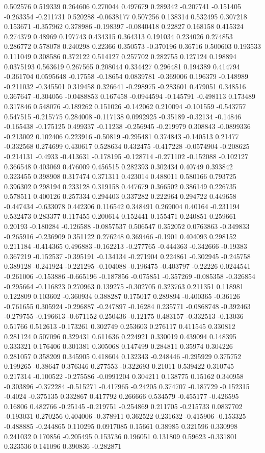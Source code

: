 0.502576 0.519339 0.264606 0.270044 0.497679 0.289342 -0.207741 -0.151405 -0.263354 -0.211731 0.520288 -0.0638177 0.507256 0.138314 0.532495 0.307218 0.153671 -0.357962 0.378986 -0.198397 -0.0840418 0.22827 0.168158 0.415324 0.274379 0.48969 0.197743 0.434315 0.364313 0.191034 0.234026 0.274853 0.286772 0.578078 0.240298 0.22366 0.350573 -0.370196 0.36716 0.500603 0.193533 0.111049 0.308586 0.372122 0.514127 0.257702 0.282755 0.127124 0.198894 0.0375193 0.563619 0.267565 0.208044 0.334427 0.296481 0.194389 0.414794 -0.361704 0.0595648 -0.17558 -0.18654 0.0839781 -0.369006 0.196379 -0.148989 -0.211032 -0.345501 0.319458 0.326641 -0.298975 -0.283601 0.479051 0.348516 0.367647 -0.304056 -0.0488853 0.167458 -0.0944594 -0.145791 -0.498113 0.173489 0.317846 0.548076 -0.189262 0.151026 -0.142062 0.210094 -0.101559 -0.543757 0.547515 -0.215775 0.284008 -0.117138 0.0992925 -0.35189 -0.32134 -0.14846 -0.165438 -0.175125 0.499337 -0.11238 -0.256945 -0.219979 0.308843 -0.0899336 -0.213002 0.102406 0.223916 -0.50819 -0.295481 0.374843 -0.140513 0.21477 -0.332568 0.274699 0.430617 0.528634 0.432475 -0.417228 -0.0574904 -0.208625 -0.214131 -0.4933 -0.413631 -0.178195 -0.128714 -0.271102 -0.152088 -0.102127 0.366548 0.403069 0.476009 0.456515 0.282393 0.302434 0.40749 0.393842 0.323455 0.398908 0.317474 0.371311 0.423014 0.488011 0.580166 0.793725 0.396302 0.298194 0.233128 0.319158 0.447679 0.366502 0.386149 0.226735 0.578511 0.400126 0.257334 0.294403 0.337282 0.222964 0.294722 0.449658 -0.447434 -0.633078 0.442306 0.116542 0.348491 0.269004 0.40164 -0.231194 0.532473 0.283377 0.117455 0.200614 0.152441 0.155471 0.240851 0.259661 0.20193 -0.180284 -0.126588 -0.0857537 0.506547 0.352052 0.0763863 -0.349833 -0.265916 -0.236909 0.351122 0.276248 0.369466 -0.1901 0.404093 0.298152 0.211184 -0.414365 0.496883 -0.162213 -0.277765 -0.444363 -0.342666 -0.19383 0.367219 -0.152537 -0.395191 -0.134134 -0.271904 0.224861 -0.302945 -0.245758 0.389128 -0.241924 -0.221295 -0.104088 -0.196475 -0.403797 -0.22226 0.0244541 -0.261006 -0.153886 -0.665196 -0.187856 -0.075851 -0.357269 -0.085358 -0.326854 -0.295664 -0.116823 0.270963 0.139275 -0.302705 0.323763 0.211351 0.118981 0.122809 0.103602 -0.360934 0.388287 0.175017 0.289894 -0.400365 -0.36126 -0.761655 0.305924 -0.296887 -0.247897 -0.16284 0.235771 -0.0868748 -0.392463 -0.279755 -0.196613 -0.671152 0.250436 -0.12175 0.483157 -0.332513 -0.13036 0.51766 0.512613 -0.173261 0.302749 0.253603 0.276117 0.411545 0.330812 0.281124 0.507096 0.329431 0.611636 0.224921 0.330019 0.439094 0.148395 0.333321 0.176406 0.301381 0.305068 0.147499 0.284811 0.35974 0.304226 0.281057 0.358209 0.345905 0.418604 0.132343 -0.248446 -0.295929 0.375752 0.199265 -0.38647 0.376346 0.277553 -0.322693 0.21011 0.539422 0.310745 0.217314 -0.100522 -0.275586 -0.0991204 0.304211 0.138775 0.15162 0.340958 -0.303896 -0.372284 -0.515271 -0.417965 -0.24205 0.374707 -0.187729 -0.152315 -0.4024 -0.375135 0.332867 0.417792 0.266666 0.534579 -0.455177 -0.426595 0.16806 0.482766 -0.25145 -0.219751 -0.254869 0.211705 -0.215733 0.0837702 -0.193031 0.270256 0.404006 -0.378911 0.362522 0.231632 -0.415906 -0.153325 -0.488885 -0.244865 0.110295 0.0917085 0.15661 0.38985 0.321596 0.330998 0.241032 0.170856 -0.205495 0.153736 0.196051 0.131809 0.59623 -0.331801 0.323536 0.141096 0.390836 -0.282871 
